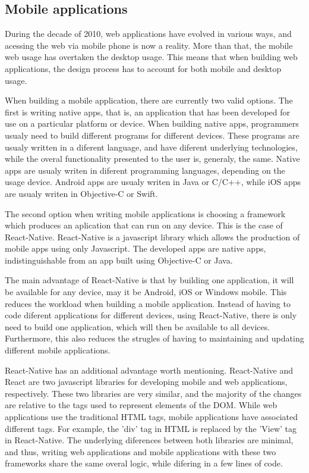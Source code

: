 \subsection{Mobile applications}

During the decade of 2010, web applications have evolved in various ways,
and acessing the web via mobile phone is now a reality. More than that,
the mobile web usage has overtaken the desktop usage. This means that
when building web applications, the design process has to account for
both mobile and desktop usage.

When building a mobile application, there are currently two valid options.
The first is writing native apps, that is, an application that has been developed
for use on a particular platform or device. When building native apps,
programmers usualy need to build different programs for different devices.
These programs are usualy written in a diferent language, and have diferent underlying technologies,
while the overal functionality presented to the user is, generaly, the same.
Native apps are usualy writen in diferent programming languages, depending on the
usage device. Android apps are usualy writen in Java or C/C++, while iOS apps
are usualy writen in Objective-C or Swift.

The second option when writing mobile applications is choosing a framework
which produces an aplication that can run on any device. This is the case of React-Native.
React-Native is a javascript library which allows the production of mobile apps
using only Javascript. The developed apps are native apps,
indistinguishable from an app built using Objective-C or Java.

The main advantage of React-Native is that by building one application,
it will be available for any device, may it be Android, iOS or Windows mobile.
This reduces the workload when building a mobile application. Instead of having
to code diferent applications for different devices, using React-Native,
there is only need to build one application, which will then be available to all devices.
Furthermore, this also reduces the strugles of having to maintaining
and updating different mobile applications.

React-Native has an additional advantage worth mentioning. React-Native and React
are two javascript libraries for developing mobile and web applications, respectively.
These two libraries are very similar, and the majority of the changes are relative
to the tags used to represent elements of the DOM. While web applications use the traditional
HTML tags, mobile applications have associated different tags. For example, the 'div' tag
in HTML is replaced by the 'View' tag in React-Native. The underlying diferences between
both libraries are minimal, and thus, writing web applications and mobile applications
with these two frameworks share the same overal logic, while difering in a few lines of code.
